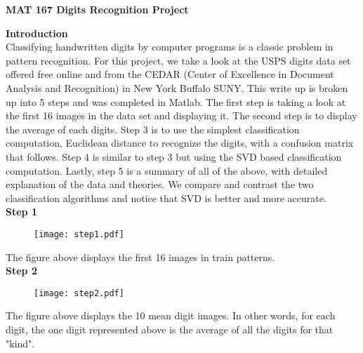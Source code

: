 \documentclass{article}
\begin{document}
\center
\textbf{\Large MAT 167 Digits Recognition Project }

\flushleft
\textbf{Introduction} \\ 
\smallskip
Classifying handwritten digits by computer programs is a classic problem in pattern recognition. For this project, we take a look at the USPS digits data set offered free online and from the CEDAR (Center of Excellence in Document Analysis and Recognition) in New York Buffalo SUNY. This write up is broken up into 5 steps and was completed in Matlab. The first step is taking a look at the first 16 images in the data set and displaying it. The second step is to display the average of each digits. Step 3 is to use the simplest classification computation, Euclidean distance to recognize the digits, with a confusion matrix that follows. Step 4 is similar to step 3 but using the SVD based classification computation. Lastly, step 5 is a summary of all of the above, with detailed explanation of the data and theories. We compare and contrast the two classification algorithms and notice that SVD is better and more accurate. \\

\flushleft
\textbf{Step 1} \\ 
\begin{figure}[!th]
  \centering
    \texttt{[image: step1.pdf]}
\end{figure} 
The figure above displays the first 16 images in train patterns. \\

\newpage
\textbf{Step 2} \\ 
\begin{figure}[!h]
  \centering
    \texttt{[image: step2.pdf]}
\end{figure} 
The figure above displays the 10 mean digit images. In other words, for each digit, the one digit represented above is the average of all the digits for that "kind". \\
\end{document}
